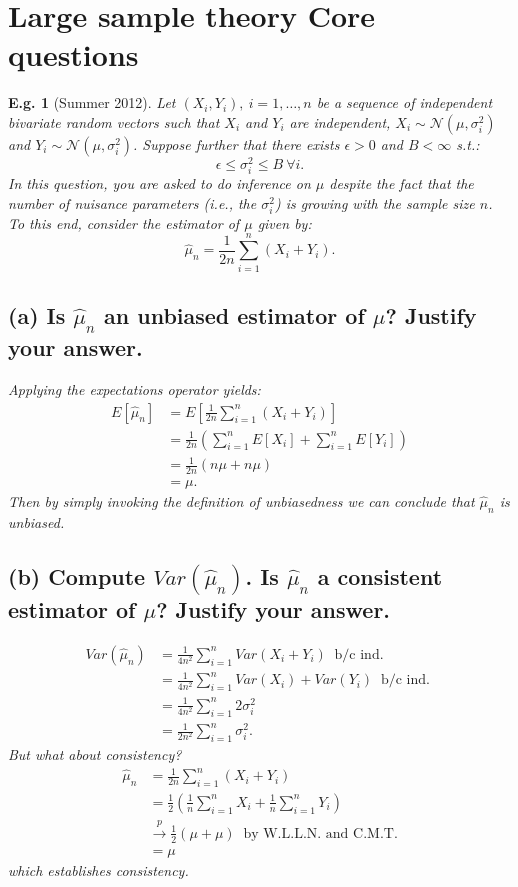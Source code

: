 \documentclass{tufte-book}
\theoremstyle{mytheoremstyle}
\theoremstyle{mylemstyle}
\theoremstyle{mydefstyle}
\newtheorem*{ex}{E.g.}
\begin{document}
\section{Large sample theory Core questions}
\begin{ex}[Summer 2012] Let \((X_i, Y_i),\ i = 1, \dots, n\) be a sequence of independent bivariate random vectors such that \(X_i\) and \(Y_i\) are independent, \(X_i \sim \mathcal{N}(\mu, \sigma^2_i)\) and \(Y_i \sim \mathcal{N}(\mu, \sigma^2_i)\). Suppose further that there exists \(\epsilon > 0\) and \(B < \infty\) s.t.:
	\[\epsilon \le \sigma_i^2 \le B\ \forall i \text{.}\]
In this question, you are asked to do inference on \(\mu\) despite the fact that the number of nuisance parameters (i.e., the \(\sigma_i^2\)) is growing with the sample size \(n\). To this end, consider the estimator of \(\mu\) given by:
	\[\hat{\mu}_n = \frac{1}{2n} \sum_{i=1}^n (X_i + Y_i) \text{.}\]

\subsection{(a) Is \(\hat{\mu}_n\) an unbiased estimator of \(\mu\)? Justify your answer.} Applying the expectations operator yields:
	\begin{align*}
		E[\hat{\mu}_n] &= E\left[ \frac{1}{2n} \sum_{i=1}^n (X_i + Y_i) \right] \\
					&= \frac{1}{2n} \left(\sum_{i=1}^n E[X_i] + \sum_{i=1}^n E[Y_i] \right) \\
					&= \frac{1}{2n} (n\mu + n\mu) \\
					&= \mu \text{.}
	\end{align*}
Then by simply invoking the definition of unbiasedness we can conclude that \(\hat{\mu}_n\) is unbiased.

\subsection{(b) Compute \(Var(\hat{\mu}_n)\). Is \(\hat{\mu}_n\) a consistent estimator of \(\mu\)? Justify your answer.}
	\begin{align*}
		Var(\hat{\mu}_n) &= \frac{1}{4n^2} \sum_{i=1}^n Var(X_i + Y_i)\ \text{ b/c ind. } \\
					&= \frac{1}{4n^2} \sum_{i=1}^n Var(X_i) + Var(Y_i)\ \text{ b/c ind. } \\
					&= \frac{1}{4n^2} \sum_{i=1}^n 2\sigma_i^2 \\
					&= \frac{1}{2n^2} \sum_{i=1}^n \sigma_i^2 \text{.}
	\end{align*}
But what about consistency? 
	\begin{align*}
		\hat{\mu}_n &= \frac{1}{2n} \sum_{i=1}^n (X_i + Y_i) \\
				&= \frac{1}{2} \left( \frac{1}{n} \sum_{i=1}^n X_i + \frac{1}{n} \sum_{i=1}^n Y_i \right) \\
				&\overset{p}{\rightarrow} \frac{1}{2}(\mu + \mu)\ \text{ by W.L.L.N. and C.M.T.} \\
				&= \mu
	\end{align*}
which establishes consistency.

\end{ex}
\end{document}
